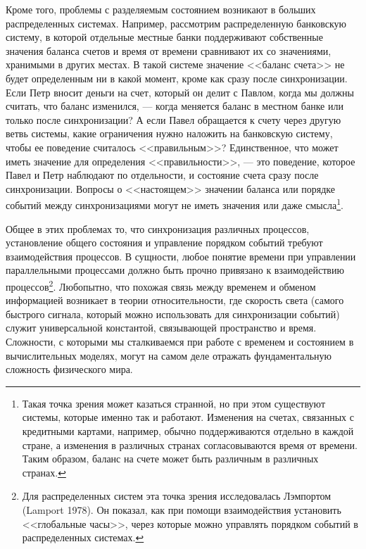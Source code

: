Кроме того, проблемы с разделяемым состоянием возникают в
больших распределенных системах.  Например, рассмотрим распределенную
банковскую систему, в которой отдельные местные банки поддерживают
собственные значения баланса счетов и время от времени сравнивают их
со значениями, хранимыми в других местах.  В такой системе значение
<<баланс счета>> не будет определенным ни в какой момент, кроме как сразу после
синхронизации.  Если Петр вносит деньги на счет, который он делит с
Павлом, когда мы должны считать, что баланс изменился, --- когда
меняется баланс в местном банке или только после синхронизации?  А
если Павел обращается к счету через другую ветвь системы, какие
ограничения нужно наложить на банковскую систему, чтобы ее
поведение считалось <<правильным>>?  Единственное, что может иметь
значение для определения <<правильности>>, --- это поведение, которое
Павел и Петр наблюдают по отдельности, и состояние счета сразу после
синхронизации.  Вопросы о <<настоящем>> значении баланса или порядке
событий между синхронизациями могут не иметь значения или даже
смысла\footnote{Такая точка зрения может казаться странной, но при
этом существуют системы, которые именно так и работают.
Изменения на счетах, связанных с кредитными картами, например, обычно
поддерживаются отдельно в каждой стране, а изменения в различных
странах согласовываются время от времени.  Таким образом, баланс на счете
может быть различным в различных странах.
}.

Общее в этих проблемах то, что синхронизация
различных процессов, установление общего состояния и управление
порядком событий требуют взаимодействия процессов.  В сущности, любое
понятие времени при управлении параллельными процессами должно быть
прочно привязано к взаимодействию процессов\footnote{Для распределенных систем эта точка зрения
исследовалась Лэмпортом (Lamport 1978).  Он
показал, как при помощи взаимодействия установить <<глобальные
часы>>, через которые можно управлять порядком событий в
распределенных системах.
}.
Любопытно, что похожая связь между временем и обменом информацией возникает
в теории относительности, где скорость света (самого быстрого сигнала,
который можно использовать для синхронизации событий) служит
универсальной константой, связывающей пространство и время.  Сложности,
с которыми мы сталкиваемся при работе с временем и состоянием в
вычислительных моделях, могут на самом деле отражать фундаментальную
сложность физического мира.

